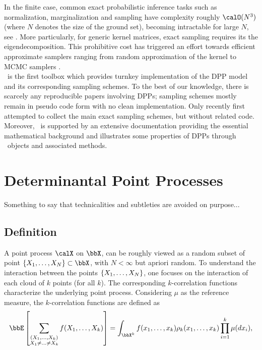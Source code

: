 \documentclass[twoside,11pt]{article}
\begin{document}
  In the finite case, common exact probabilistic inference tasks such as normalization, marginalization and sampling have complexity roughly $\calO(N^3)$ (where $N$ denotes the size of the ground set), becoming intractable for large $N$, see \citet{Gil14}.
  More particularly, for generic kernel matrices, exact sampling requires its the eigendecomposition.
  This prohibitive cost has triggered an effort towards efficient approximate samplers ranging from random approximation of the kernel \citep{AfKuFo13} to MCMC samplers \citep{AnGhRe16, LiJeSr16c, GaBaVa17}.\\

  \DPPy\ is the first toolbox which provides turnkey implementation of the DPP model and its corresponding sampling schemes.
  To the best of our knowledge, there is scarcely any reproducible papers involving DPPs; sampling schemes mostly remain in pseudo code form with no clean implementation.
  Only recently \citet{TrBaAm18} first attempted to collect the main exact sampling schemes, but without related code.
  Moreover, \DPPy\ is supported by an extensive documentation providing the essential mathematical background and illustrates some properties of DPPs through \DPPy\ objects and associated methods.


\section{Determinantal Point Processes} %
\label{sec:determinantal_point_processes}

  Something to say that technicalities and subtleties are avoided on purpose...

  \subsection{Definition} %
  \label{sub:definition}
  
    A point process $\calX$ on $\bbX$, can be roughly viewed as a random subset of point $\lrcb{X_1, \dots, X_N} \subset \bbX$, with $N<\infty$ but apriori random.
    To understand the interaction between the points $\left\{ X_1, \dots, X_N \right\}$, one focuses on the interaction of each cloud of $k$ points (for all $k$). 
    The corresponding $k$-correlation functions characterize the underlying point process.
    Considering $\mu$ as the reference measure, the $k$-correlation functions are defined as
    \begin{equation}
    \label{eq:k-correlation_function}
      \Espe{ \sum_{  
        \substack{
          (X_1,\dots,X_k) \\ 
          X_1 \neq \dots \neq X_k} } 
        f(X_1,\dots,X_k) 
        }
        = \int_{\bbX^k} 
          f(x_1,\dots,x_k) \rho_k(x_1,\dots,x_k) 
          \prod_{i=1}^k \mu(dx_i),
    \end{equation}
\end{document}
